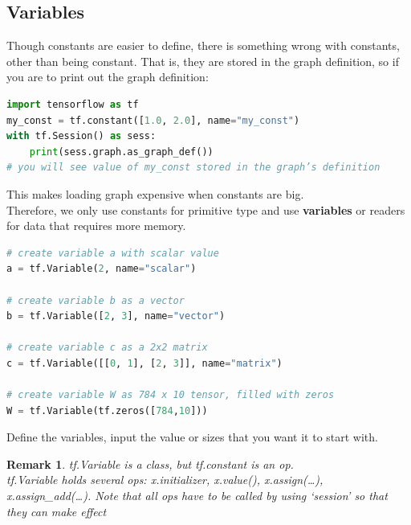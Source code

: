 \documentclass{article}
\newtheorem*{remark}{Remark}
\begin{document}
	\subsection{Variables}
	Though constants are easier to define, there is something wrong with constants, other than being constant. That is, they are stored in the graph definition, so if you are to print out the graph definition:
\begin{lstlisting}[language=Python,morekeywords ={as}]
import tensorflow as tf
my_const = tf.constant([1.0, 2.0], name="my_const")
with tf.Session() as sess:
	print(sess.graph.as_graph_def())
# you will see value of my_const stored in the graph’s definition
\end{lstlisting}
	\noindent This makes loading graph expensive when constants are big.\\
	 Therefore, we only use constants for primitive type and use \textbf{variables} or readers for data that requires more memory.
	 \begin{lstlisting}[language=Python,morekeywords ={as}]
# create variable a with scalar value
a = tf.Variable(2, name="scalar")

# create variable b as a vector
b = tf.Variable([2, 3], name="vector")

# create variable c as a 2x2 matrix
c = tf.Variable([[0, 1], [2, 3]], name="matrix")

# create variable W as 784 x 10 tensor, filled with zeros
W = tf.Variable(tf.zeros([784,10]))
\end{lstlisting}
	Define the variables, input the value or sizes that you want it to start with.
	\begin{remark}
		tf.Variable is a class, but tf.constant is an op. \\
	    tf.Variable holds several ops: x.initializer, x.value(), x.assign(\dots), x.assign\_add(\dots). Note that all ops have to be called by using `session' so that they can make effect
	\end{remark}
	
\end{document}
